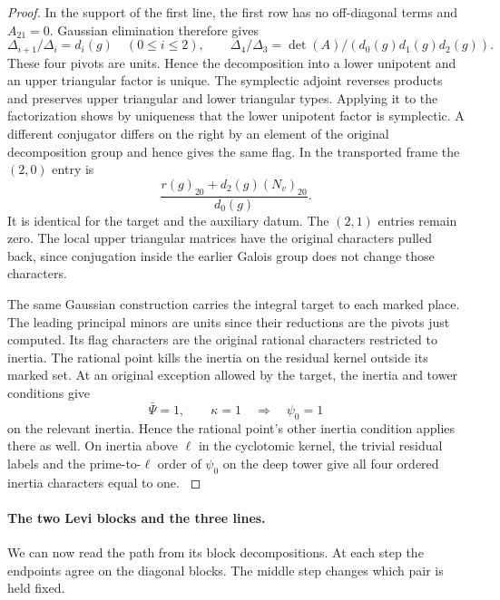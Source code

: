 \begin{proof}
In the support
of the first line, the first row has no off-diagonal terms and
\(A_{21}=0\). Gaussian elimination therefore gives
\[
 \Delta_{i+1}/\Delta_i=d_i(g)\quad(0\le i\le2),\qquad
 \Delta_4/\Delta_3=\det(A)/(d_0(g)d_1(g)d_2(g)).
\]
These four pivots are units. Hence the decomposition into a lower
unipotent and an upper triangular factor is unique.
The symplectic adjoint reverses products and preserves
upper triangular and lower triangular types. Applying it
to the factorization shows by uniqueness that the lower
unipotent factor is symplectic. A different conjugator
differs on the right by an element of the original
decomposition group and hence gives the same flag.
In the transported frame the \((2,0)\) entry is
\[
             \frac{r(g)_{20}+d_2(g)(N_v)_{20}}{d_0(g)} .
\]
It is identical for the target and the auxiliary datum.
The \((2,1)\) entries remain zero. The local upper
triangular matrices have the original characters pulled
back, since conjugation inside the earlier Galois group
does not change those characters.

The same Gaussian construction carries the integral
target to each marked place. The leading principal
minors are units since their reductions are the
pivots just computed. Its flag characters are the
original rational characters restricted to inertia.
The rational point kills the inertia on the residual
kernel outside its marked set. At an original exception allowed by the target, the inertia and tower conditions give
\[
 \bar\Psi=1,\qquad\kappa=1\quad\Longrightarrow\quad\psi_0=1
\]
on the relevant inertia. Hence the rational point's other inertia condition applies there as well.
On inertia above \(\ell\) in the cyclotomic kernel,
the trivial residual labels and the prime-to-\(\ell\)
order of \(\psi_0\) on the deep tower give all four
ordered inertia characters equal to one.
\label{cor:cohomology-count-two-chain-3}
\end{proof}

\paragraph{The two Levi blocks and the three lines.}
\label{par:count-two-lines}
We can now read the path from its block decompositions. At each step the endpoints agree on the diagonal blocks. The middle step changes which
pair is held fixed.
\begin{construction}
\caption{Block orders for the three affine lines of Proposition~\ref{prop:count-two-three-lines}. In the indicated order the endpoint differences belong to the square-zero off-block ideal.}\label{fig:analytic-three-lines}
\end{construction}

